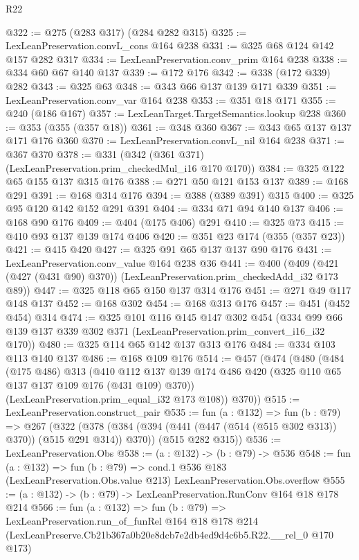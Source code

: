 \begin{lexlean}{R22}
\begin{coremodule}
@322 := @275 (@283 @317) (@284 @282 @315)
@325 := LexLeanPreservation.convL_cons @164 @238
@331 := @325 @68 @124 @142 @157 @282 @317
@334 := LexLeanPreservation.conv_prim @164 @238
@338 := @334 @60 @67 @140 @137
@339 := @172 @176
@342 := @338 (@172 @339) @282
@343 := @325 @63
@348 := @343 @66 @137 @139 @171 @339
@351 := LexLeanPreservation.conv_var @164 @238
@353 := @351 @18 @171
@355 := @240 (@186 @167)
@357 := LexLeanTarget.TargetSemantics.lookup @238
@360 := @353 (@355 (@357 @18))
@361 := @348 @360
@367 := @343 @65 @137 @137 @171 @176 @360
@370 := LexLeanPreservation.convL_nil @164 @238
@371 := @367 @370
@378 := @331 (@342 (@361 @371) (LexLeanPreservation.prim_checkedMul_i16 @170 @170))
@384 := @325 @122 @65 @155 @137 @315 @176
@388 := @271 @50 @121 @153 @137
@389 := @168 @291
@391 := @168 @314 @176
@394 := @388 (@389 @391) @315
@400 := @325 @95 @120 @142 @152 @291 @391
@404 := @334 @71 @94 @140 @137
@406 := @168 @90 @176
@409 := @404 (@175 @406) @291
@410 := @325 @73
@415 := @410 @93 @137 @139 @174 @406
@420 := @351 @23 @174 (@355 (@357 @23))
@421 := @415 @420
@427 := @325 @91 @65 @137 @137 @90 @176
@431 := LexLeanPreservation.conv_value @164 @238 @36
@441 := @400 (@409 (@421 (@427 (@431 @90) @370)) (LexLeanPreservation.prim_checkedAdd_i32 @173 @89))
@447 := @325 @118 @65 @150 @137 @314 @176
@451 := @271 @49 @117 @148 @137
@452 := @168 @302
@454 := @168 @313 @176
@457 := @451 (@452 @454) @314
@474 := @325
    @101
    @116
    @145
    @147
    @302
    @454
    (@334 @99 @66 @139 @137 @339 @302 @371 (LexLeanPreservation.prim_convert_i16_i32 @170))
@480 := @325 @114 @65 @142 @137 @313 @176
@484 := @334 @103 @113 @140 @137
@486 := @168 @109 @176
@514 := @457
    (@474
      (@480
        (@484
          (@175 @486)
          @313
          (@410 @112 @137 @139 @174 @486 @420 (@325 @110 @65 @137 @137 @109 @176 (@431 @109) @370))
          (LexLeanPreservation.prim_equal_i32 @173 @108))
        @370))
@515 := LexLeanPreservation.construct_pair
@535 := fun (a : @132) =>
  fun (b : @79) =>
  @267
    (@322
      (@378 (@384 (@394 (@441 (@447 (@514 (@515 @302 @313)) @370)) (@515 @291 @314)) @370))
      (@515 @282 @315))
@536 := LexLeanPreservation.Obs
@538 := (a : @132) -> (b : @79) -> @536
@548 := fun (a : @132) =>
  fun (b : @79) =>
  cond.{1} @536 @183 (LexLeanPreservation.Obs.value @213) LexLeanPreservation.Obs.overflow
@555 := (a : @132) -> (b : @79) -> LexLeanPreservation.RunConv @164 @18 @178 @214
@566 := fun (a : @132) =>
  fun (b : @79) =>
  LexLeanPreservation.run_of_funRel
    @164
    @18
    @178
    @214
    (LexLeanPreserve.Cb21b367a0b20e8dcb7e2db4ed9d4c6b5.R22.__rel_0 @170 @173)
\end{coremodule}
\end{lexlean}

